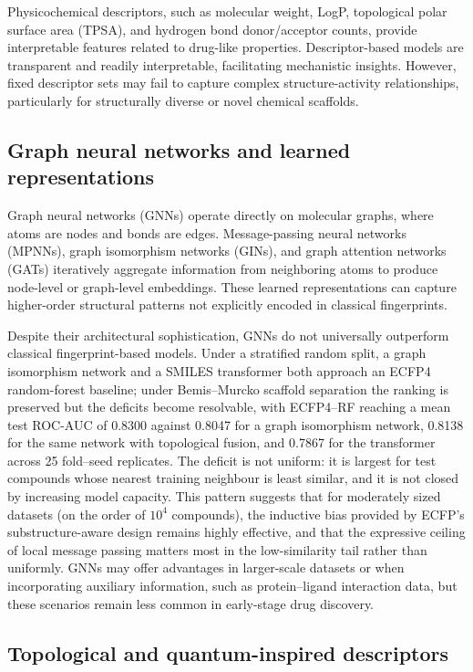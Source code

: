 Physicochemical descriptors, such as molecular weight, LogP, topological polar surface area (TPSA), and hydrogen bond donor/acceptor counts, provide interpretable features related to drug-like properties. Descriptor-based models are transparent and readily interpretable, facilitating mechanistic insights. However, fixed descriptor sets may fail to capture complex structure-activity relationships, particularly for structurally diverse or novel chemical scaffolds.

\subsection{Graph neural networks and learned representations}

Graph neural networks (GNNs) operate directly on molecular graphs, where atoms are nodes and bonds are edges. Message-passing neural networks (MPNNs), graph isomorphism networks (GINs), and graph attention networks (GATs) iteratively aggregate information from neighboring atoms to produce node-level or graph-level embeddings. These learned representations can capture higher-order structural patterns not explicitly encoded in classical fingerprints.

Despite their architectural sophistication, GNNs do not universally outperform classical fingerprint-based models. Under a stratified random split, a graph isomorphism network and a SMILES transformer both approach an ECFP4 random-forest baseline; under Bemis--Murcko scaffold separation the ranking is preserved but the deficits become resolvable, with ECFP4--RF reaching a mean test ROC-AUC of \num{0.8300} against \num{0.8047} for a graph isomorphism network, \num{0.8138} for the same network with topological fusion, and \num{0.7867} for the transformer across \num{25} fold--seed replicates. The deficit is not uniform: it is largest for test compounds whose nearest training neighbour is least similar, and it is not closed by increasing model capacity. This pattern suggests that for moderately sized datasets (on the order of $10^{4}$ compounds), the inductive bias provided by ECFP's substructure-aware design remains highly effective, and that the expressive ceiling of local message passing matters most in the low-similarity tail rather than uniformly. GNNs may offer advantages in larger-scale datasets or when incorporating auxiliary information, such as protein--ligand interaction data, but these scenarios remain less common in early-stage drug discovery.

\subsection{Topological and quantum-inspired descriptors}

